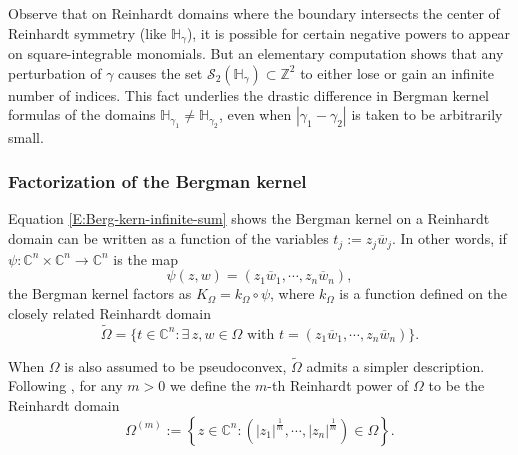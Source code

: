 \documentclass[letterpaper,11pt,reqno]{amsart}
\theoremstyle{plain}
\theoremstyle{definition}
\theoremstyle{remark}
\theoremstyle{remark}
\numberwithin{equation}{section}
\newcommand{\ol}{\overline}
\newcommand{\wt}{\widetilde}
\newcommand{\cs}{{\mathcal S}}
\newcommand{\C}{{\mathbb C}}
\newcommand{\h}{{\mathbb H}}
\newcommand{\Z}{{\mathbb Z}}
\begin{document}
Observe that on Reinhardt domains where the boundary intersects the center of Reinhardt symmetry (like $\h_\gamma$), it is possible for certain negative powers to appear on square-integrable monomials.
But an elementary computation shows that any perturbation of $\gamma$ causes the set $\cs_2(\h_\gamma) \subset \Z^2$ to either lose or gain an infinite number of indices.
This fact underlies the drastic difference in Bergman kernel formulas of the domains $\h_{\gamma_1} \neq \h_{\gamma_2}$, even when $ |\gamma_1 - \gamma_2|$ is taken to be arbitrarily small.

\subsubsection{Factorization of the Bergman kernel}
Equation \eqref{E:Berg-kern-infinite-sum} shows the Bergman kernel on a Reinhardt domain can be written as a function of the variables $t_j := z_j\ol{w}_j$. 
In other words, if $\psi : \C^n \times \C^n \to \C^n$ is the map
\begin{equation*}
\psi(z,w) = (z_1\ol{w}_1,\cdots,z_n\ol{w}_n),
\end{equation*}
the Bergman kernel factors as $K_\Omega = k_\Omega \circ \psi$, where $k_\Omega$ is a function defined on the closely related Reinhardt domain
\begin{equation}\label{E:def-Omega-tilde}
\wt{\Omega} = \{t \in \C^n : \exists \, z,w \in \Omega \,\, \mathrm{with} \,\, t = (z_1\ol{w}_1,\cdots,z_n\ol{w}_n) \}.
\end{equation}

When $\Omega$ is also assumed to be pseudoconvex, $\wt\Omega$ admits a simpler description.
Following \cite{ChakEdh24}, for any $m>0$ we define the $m$-th Reinhardt power of $\Omega$ to be the Reinhardt domain
\begin{equation}\label{E:def-Reinhardt-square}
\Omega^{(m)} := \left\{ z \in \C^n : (|z_1|^{\frac{1}{m}},\cdots,|z_n|^{\frac{1}{m}}) \in \Omega \right\}.
\end{equation}
\end{document}
